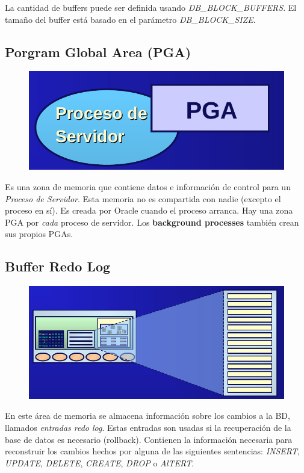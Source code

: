 La cantidad de buffers puede ser definida usando \textit{DB\_BLOCK\_BUFFERS}. El tamaño del buffer está basado en el parámetro \textit{DB\_BLOCK\_SIZE}.

\subsection{Porgram Global Area (PGA)}

\begin{figure}[H]
  \center
  \includegraphics[scale=0.2]{img/p5.png}
\end{figure}

Es una zona de memoria que contiene datos e información de control para un \textit{Proceso de Servidor}. Esta memoria no es compartida con nadie (excepto el proceso en sí). Es creada por Oracle cuando el proceso arranca. Hay una zona PGA por \textit{cada} proceso de servidor. Los \textbf{background processes} también crean sus propios PGAs.

\subsection{Buffer Redo Log}

\begin{figure}[H]
  \center
  \includegraphics[scale=0.2]{img/p6.png}
\end{figure}

En este área de memoria se almacena información sobre los cambios a la BD, llamados \textit{entradas redo log}. Estas entradas son usadas si la recuperación de la base de datos es necesario (rollback). Contienen la información necesaria para reconstruir los cambios hechos por alguna de las siguientes sentencias: \textit{INSERT}, \textit{UPDATE}, \textit{DELETE}, \textit{CREATE}, \textit{DROP} o \textit{AlTERT}.

